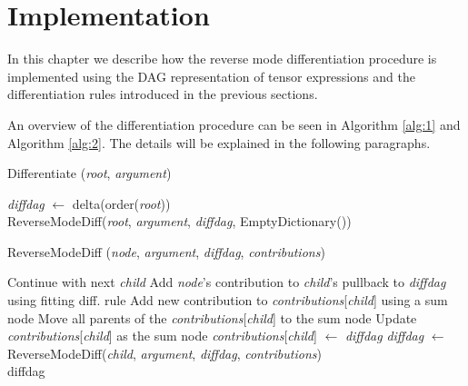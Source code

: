 \documentclass[12pt, a4paper]{report}
\begin{document}
\FloatBarrier
\section{Implementation}
In this chapter we describe how the reverse mode differentiation procedure is implemented using the DAG representation of tensor expressions and the differentiation rules introduced in the previous sections.

An overview of the differentiation procedure can be seen in Algorithm \ref{alg:1} and Algorithm \ref{alg:2}.
The details will be explained in the following paragraphs.

\begin{algorithm}
    \caption[Driver for DAG Differentiation]{Differentiate (\textit{root}, \textit{argument})}\label{alg:1}
    \begin{algorithmic}
        \State \textit{diffdag} $\gets$ delta(order(\textit{root}))  \\
        \Return ReverseModeDiff(\textit{root}, \textit{argument}, \textit{diffdag}, EmptyDictionary())
    \end{algorithmic}
\end{algorithm}

\begin{algorithm}
    \caption[Recursive DAG Differentiation]{ReverseModeDiff (\textit{node}, \textit{argument}, \textit{diffdag}, \textit{contributions})}\label{alg:2}
    \begin{algorithmic}
                \State Continue with next \textit{child}
            \EndIf
            \State Add \textit{node}'s contribution to \textit{child}'s pullback to \textit{diffdag} using fitting diff. rule
                \State Add new contribution to \textit{contributions}[\textit{child}] using a sum node
                \State Move all parents of the \textit{contributions}[\textit{child}] to the sum node
                \State Update \textit{contributions}[\textit{child}] as the sum node
            \Else
                \State \textit{contributions}[\textit{child}] $\gets$ \textit{diffdag}
                \State \textit{diffdag} $\gets$ ReverseModeDiff(\textit{child}, \textit{argument}, \textit{diffdag}, \textit{contributions})
            \EndIf
        \EndFor \\
        \Return diffdag
    \end{algorithmic}
\end{algorithm}
\end{document}
